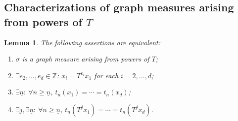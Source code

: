 \documentclass[10pt]{amsart}
\newtheorem{lemm}[theo]{Lemma}\newtheorem{prop}[theo]{Proposition}\newtheorem{coro}[theo]{Corollary}\newtheorem{conj}[theo]{Conjecture}
\theoremstyle{definition}\newtheorem{defi}[theo]{Definition}\newtheorem{rema}[theo]{Remark}\newtheorem{exam}[theo]{Example}\newtheorem{exem}[theo]{Example}\newtheorem{nota}[theo]{Notation}
\newcommand{\ZZ}{\mathbb{Z}}
\newcommand{\nb}{\underline{n}}
\let\oldexists\exists
\renewcommand*{\exists}{\mathrel{\oldexists}}
\let\oldforall\forall
\renewcommand*{\forall}{\mathrel{\oldforall}}
\begin{document}
\subsection{Characterizations of graph measures arising from powers of \texorpdfstring{$T$}{T}}\label{sec:graph}

\begin{lemm}\label{lemma:graph}
The following assertions are equivalent:
\begin{enumerate}%
\item \label{3.13.1} $\sigma$ is a graph measure arising from powers of $T$;
\item \label{3.13.2} $\exists e_2,\ldots,e_d\in\ZZ$: $x_i=T^{e_i}x_1$ for each $i=2,\ldots,d$;
\item \label{3.13.3} $\exists\nb:\ \forall n\ge\nb$, $t_n(x_1)=\cdots=t_n(x_d)$;
\item \label{3.13.4} $\exists j,\exists\nb:\ \forall n\ge\nb$, $t_n(T^jx_1)=\cdots=t_n(T^jx_d)$.
\end{enumerate}
\end{lemm}
\end{document}
